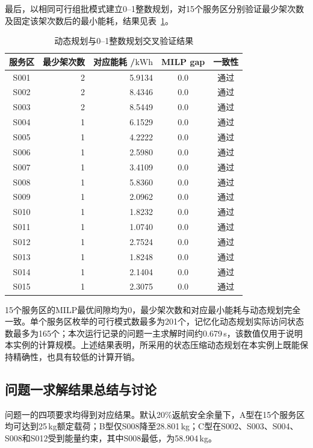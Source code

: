 \documentclass[bwprint,fontset=fandol]{gmcmthesis}
\begin{document}
最后，以相同可行组批模式建立0--1整数规划，对15个服务区分别验证最少架次数及固定该架次数后的最小能耗，结果见表~\ref{tab:q1-validation}。

\begin{table}[htbp!]
  \centering
  \small
  \setlength{\tabcolsep}{5pt}
  \renewcommand{\arraystretch}{1.15}
  \caption{动态规划与0--1整数规划交叉验证结果}
  \label{tab:q1-validation}
  \begin{tabular*}{0.92\linewidth}{@{\extracolsep{\fill}}crrcc@{}}
    \toprule
    服务区 & 最少架次数 & \shortstack{对应能耗\\ /$\mathrm{kWh}$} & MILP gap & 一致性 \\
    \midrule
    S001 & 2 & 5.9134 & 0.0 & 通过 \\
    S002 & 2 & 8.4346 & 0.0 & 通过 \\
    S003 & 2 & 8.5449 & 0.0 & 通过 \\
    S004 & 1 & 6.1529 & 0.0 & 通过 \\
    S005 & 1 & 4.2222 & 0.0 & 通过 \\
    S006 & 1 & 2.5980 & 0.0 & 通过 \\
    S007 & 1 & 3.4109 & 0.0 & 通过 \\
    S008 & 1 & 5.8360 & 0.0 & 通过 \\
    S009 & 1 & 2.0962 & 0.0 & 通过 \\
    S010 & 1 & 1.8232 & 0.0 & 通过 \\
    S011 & 1 & 1.0740 & 0.0 & 通过 \\
    S012 & 1 & 2.7524 & 0.0 & 通过 \\
    S013 & 1 & 1.8248 & 0.0 & 通过 \\
    S014 & 1 & 2.1404 & 0.0 & 通过 \\
    S015 & 1 & 2.3075 & 0.0 & 通过 \\
    \bottomrule
  \end{tabular*}
\end{table}

15个服务区的MILP最优间隙均为0，最少架次数和对应最小能耗与动态规划完全一致。单个服务区枚举的可行模式数最多为201个，记忆化动态规划实际访问状态数最多为165个；本次运行记录的问题一主求解时间约0.679\,s，该数值仅用于说明本实例的计算规模。上述结果表明，所采用的状态压缩动态规划在本实例上既能保持精确性，也具有较低的计算开销。

\subsection{问题一求解结果总结与讨论}
问题一的四项要求均得到对应结果。默认20\%返航安全余量下，A型在15个服务区均可达到25\,kg额定载荷；B型仅S008降至28.801\,kg；C型在S002、S003、S004、S008和S012受到能量约束，其中S008最低，为58.904\,kg。
\end{document}
